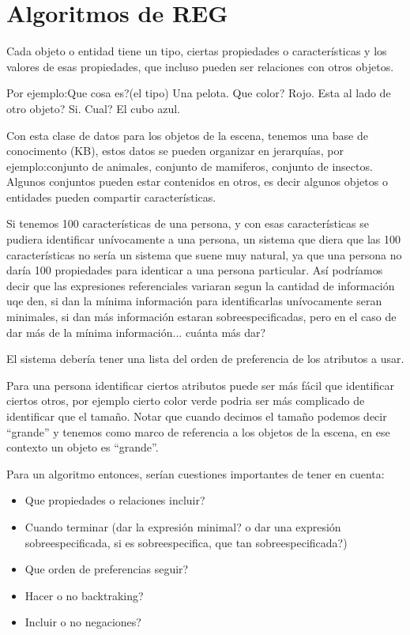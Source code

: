 \section{Algoritmos de REG}

Cada objeto o entidad tiene un tipo, ciertas propiedades o caracter\'isticas y los valores de esas propiedades, que incluso pueden ser relaciones con otros objetos. 

Por ejemplo:Que cosa es?(el tipo) Una pelota. Que color? Rojo. Esta al lado de otro objeto? Si. Cual? El cubo azul.

Con esta clase de datos para los objetos de la escena, tenemos una base de conocimento (KB), estos datos se pueden organizar en jerarqu\'ias, por ejemplo:conjunto de animales, conjunto de mamiferos, conjunto de insectos. Algunos conjuntos pueden estar contenidos en otros, es decir algunos objetos o entidades pueden compartir caracter\'isticas.

Si tenemos 100 caracter\'isticas de una persona, y con esas caracter\'isticas se pudiera identificar un\'ivocamente a una persona, un sistema que diera que las 100 caracter\'isticas no ser\'ia un sistema que suene muy natural, ya que una persona no dar\'ia 100 propiedades para identicar a una persona particular. As\'i podr\'iamos decir que las expresiones referenciales variaran segun la cantidad de informaci\'on uqe den, si dan la m\'inima informaci\'on para identificarlas un\'ivocamente seran minimales, si dan m\'as informaci\'on estaran sobreespecificadas, pero en el caso de dar m\'as de la m\'inima informaci\'on... cu\'anta m\'as dar?

El sistema deber\'ia tener una lista del orden de preferencia de los atributos a usar. 

Para una persona identificar ciertos atributos puede ser m\'as f\'acil que identificar ciertos otros, por ejemplo cierto color verde podria ser m\'as complicado de identificar que el tama\~no. Notar que cuando decimos el tama\~no podemos decir ``grande'' y tenemos como marco de referencia a los objetos de la escena, en ese contexto un objeto es ``grande''.

Para un algoritmo entonces, ser\'ian cuestiones importantes de tener en cuenta:

\begin{itemize}
 \item Que propiedades o relaciones incluir?
 \item Cuando terminar (dar la expresi\'on minimal? o dar una expresi\'on sobreespecificada, si es sobreespecifica, que tan sobreespecificada?)
 \item Que orden de preferencias seguir?
 \item Hacer o no backtraking?
 \item Incluir o no negaciones?
\end{itemize}



